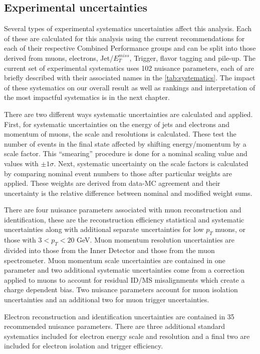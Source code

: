 \subsection{Experimental uncertainties}
Several types of experimental systematics uncertainties affect this analysis. Each of these are calculated for this analysis using the current recommendations for each of their respective Combined Performance groups and can be split into those derived from muons, electrons, Jet/$E_T^{miss}$, Trigger, flavor tagging and pile-up. The current set of experimental systematics uses 102 nuisance parameters, each of are briefly described with their associated names in the \ref{tab:systematics}. The impact of these systematics on our overall result as well as rankings and interpretation of the most impactful systematics is in the next chapter. 
 
There are two different ways systematic uncertainties are calculated and applied. First, for systematic uncertainties on the energy of jets and electrons and momentum of muons, the scale and resolutions is calculated. These test the number of events in the final state affected by shifting energy/momentum by a scale factor. This ``smearing'' procedure is done for a nominal scaling value and values with $\pm 1 \sigma$. Next, systematic uncertainty on the scale factors is calculated by comparing nominal event numbers to those after particular weights are applied. These weights are derived from data-MC agreement and their uncertainty is the relative difference between nominal and modified weight sums.  
 
There are four nuisance parameters associated with muon reconstruction and identification, these are the reconstruction efficiency statistical and systematic uncertainties along with additional separate uncertainties for low $p_T$ muons, or those with $3 < p_T <20$ GeV. Muon momentum resolution uncertainties are divided into those from the Inner Detector and those from the muon spectrometer. Muon momentum scale uncertainties are contained in one parameter and two additional systematic uncertainties come from a correction applied to muons to account for residual ID/MS misalignments which create a charge dependent bias. Two nuisance parameters account for muon isolation uncertainties and an additional two for muon trigger uncertainties.  

Electron reconstruction and identification uncertainties are contained in 35 recommended nuisance parameters. There are three additional standard systematics included for electron energy scale and resolution and a final two are included for electron isolation and trigger efficiency.

